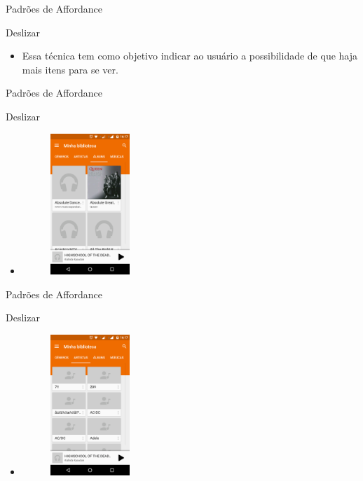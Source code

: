 \begin{frame}{Padrões de Affordance}
\begin{block}{Deslizar}
  \begin{itemize}
    \item<1-> Essa técnica tem como objetivo indicar ao usuário a possibilidade de que haja mais itens para se ver.
  \end{itemize}
\end{block}
\end{frame}

\begin{frame}{Padrões de Affordance}
\begin{block}{Deslizar}
  \begin{itemize}
    \item<1-> \begin{figure}
    \includegraphics[width=3cm]{figuras/deslize/deslize2}
    \end{figure}
  \end{itemize}
\end{block}
\end{frame}

\begin{frame}{Padrões de Affordance}
\begin{block}{Deslizar}
  \begin{itemize}
    \item<1-> \begin{figure}
    \includegraphics[width=3cm]{figuras/deslize/deslize3}
    \end{figure}
  \end{itemize}
\end{block}
\end{frame}

